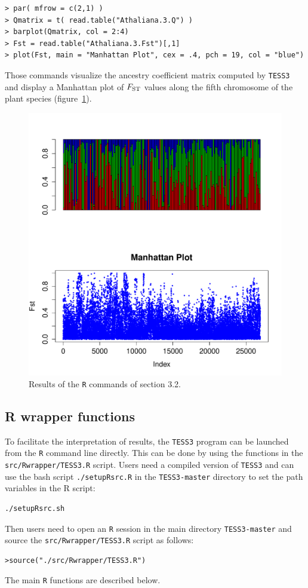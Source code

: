 \documentclass[10pt,a4paper]{article}
\begin{document}
\begin{Verbatim}[frame=single]
> par( mfrow = c(2,1) )
> Qmatrix = t( read.table("Athaliana.3.Q") )
> barplot(Qmatrix, col = 2:4)
> Fst = read.table("Athaliana.3.Fst")[,1]
> plot(Fst, main = "Manhattan Plot", cex = .4, pch = 19, col = "blue")
\end{Verbatim}

Those commands visualize the ancestry coefficient matrix computed by {\tt TESS3} and display a Manhattan plot of $F_{\rm ST}$ values along the fifth chromosome of the plant species (figure~\ref{fig:bar}).


\begin{figure}[h!]\centering
\includegraphics[width=\linewidth]{barplot.pdf}
\caption{Results of the {\tt R} commands of section 3.2.}\label{fig:bar}
\end{figure} 

\subsection{R wrapper functions}
To facilitate the interpretation of results, the {\tt TESS3} program can be launched from the {\tt R} command line directly. This can be done by using the functions in the  \verb|src/Rwrapper/TESS3.R| script. Users need a compiled version of {\tt TESS3} and can use the bash script \verb|./setupRsrc.R| in the {\tt TESS3-master} directory to set the path variables in the R script:
\begin{Verbatim}[frame=single]
./setupRsrc.sh
\end{Verbatim}
Then users need to open an {\tt R} session in the main directory {\tt TESS3-master} and source the \verb|src/Rwrapper/TESS3.R| script as follows: 
\begin{Verbatim}[frame=single]
>source("./src/Rwrapper/TESS3.R")
\end{Verbatim}
The main {\tt R} functions are described below.
\end{document}
